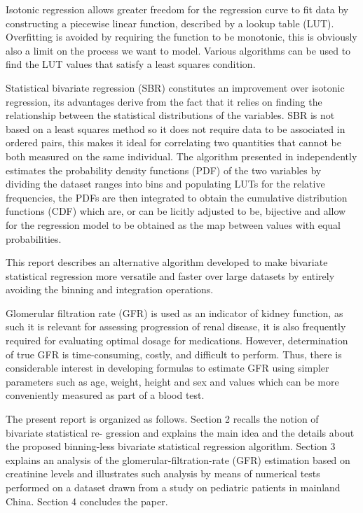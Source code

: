 \documentclass[10pt,final]{siamltex}
\begin{document}
Isotonic regression allows greater freedom for the regression curve to fit data by constructing a piecewise linear function, described by a lookup table (LUT). Overfitting is avoided by requiring the function to be monotonic, this is obviously also a limit on the process we want to model. Various algorithms can be used to find the LUT values that satisfy a least squares condition.

Statistical bivariate regression (SBR) constitutes an improvement over isotonic regression, its advantages derive from the fact that it relies on finding the relationship between the statistical distributions of the variables. SBR is not based on a least squares method so it does not require data to be associated in ordered pairs, this makes it ideal for correlating two quantities that cannot be both measured on the same individual. The algorithm presented in \cite{fiori} independently estimates the probability density functions (PDF) of the two variables by dividing the dataset ranges into bins and populating LUTs for the relative frequencies, the PDFs are then integrated to obtain the cumulative distribution functions (CDF) which are, or can be licitly adjusted to be, bijective and allow for the regression model to be obtained as the map between values with equal probabilities.

This report describes an alternative algorithm developed to make bivariate statistical regression more versatile and faster over large datasets by entirely avoiding the binning and integration operations.

Glomerular filtration rate (GFR) is used as an indicator of kidney function, as such it is relevant for assessing progression of renal disease, it is also frequently required for evaluating optimal dosage for medications. However, determination of true GFR is time-consuming, costly, and difficult to perform. Thus, there is considerable interest in developing formulas to estimate GFR using simpler parameters such as age, weight, height and sex and values which can be more conveniently measured as part of a blood test.

The present report is organized as follows. Section 2 recalls the notion of bivariate statistical re- gression and explains the main idea and the details about the proposed binning-less bivariate statistical regression algorithm. Section 3 explains an analysis of the glomerular-filtration-rate (GFR) estimation based on creatinine levels and illustrates such analysis by means of numerical tests performed on a dataset drawn from a study on pediatric patients in mainland China. Section 4 concludes the paper.
%
\end{document}

